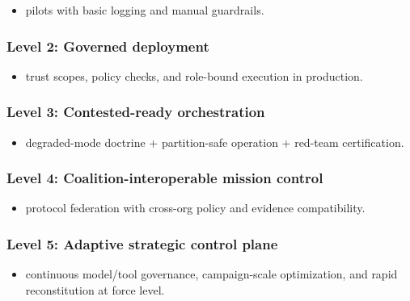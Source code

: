 \documentclass[
]{article}
\providecommand{\tightlist}{%
  \setlength{\itemsep}{0pt}\setlength{\parskip}{0pt}}
\begin{document}
\begin{itemize}
\tightlist
\item
  pilots with basic logging and manual guardrails.
\end{itemize}

\hypertarget{level-2-governed-deployment}{%
\subsubsection{Level 2: Governed
deployment}\label{level-2-governed-deployment}}

\begin{itemize}
\tightlist
\item
  trust scopes, policy checks, and role-bound execution in production.
\end{itemize}

\hypertarget{level-3-contested-ready-orchestration}{%
\subsubsection{Level 3: Contested-ready
orchestration}\label{level-3-contested-ready-orchestration}}

\begin{itemize}
\tightlist
\item
  degraded-mode doctrine + partition-safe operation + red-team
  certification.
\end{itemize}

\hypertarget{level-4-coalition-interoperable-mission-control}{%
\subsubsection{Level 4: Coalition-interoperable mission
control}\label{level-4-coalition-interoperable-mission-control}}

\begin{itemize}
\tightlist
\item
  protocol federation with cross-org policy and evidence compatibility.
\end{itemize}

\hypertarget{level-5-adaptive-strategic-control-plane}{%
\subsubsection{Level 5: Adaptive strategic control
plane}\label{level-5-adaptive-strategic-control-plane}}

\begin{itemize}
\tightlist
\item
  continuous model/tool governance, campaign-scale optimization, and
  rapid reconstitution at force level.
\end{itemize}
\end{document}
